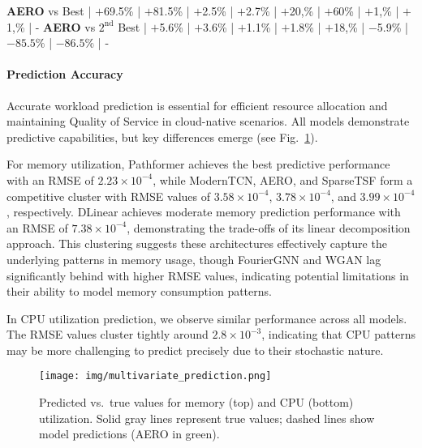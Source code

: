 \documentclass{ieeetmlcn}
\begin{document}
\begin{table}
{\begin{tabular}
    \textbf{AERO} vs Best  |  $+$69.5\%  |  $+$81.5\%  |  $+$2.5\%  |  $+$2.7\%  |  $+$20,\%  |  $+$60\%  |  $+$1,\%  |  $+$1,\%  |  - 
    \textbf{AERO} vs $2^{\text{nd}}$ Best  |  $+$5.6\%  |  $+$3.6\%  |  $+$1.1\%  |  $+$1.8\%  |  $+$18,\%  |  $-$5.9\%  |  $-85.5\%$  |  $-86.5\%$  |  - 
    
    \end{tabular}%
    }
\end{table}
    
    
\paragraph*{Prediction Accuracy}
\label{sec:predictionaccuracy}

Accurate workload prediction is essential for efficient resource allocation and maintaining Quality of Service in cloud-native scenarios. All models demonstrate predictive capabilities, but key differences emerge (see Fig.~\ref{fig:multivariate_prediction}). 

For memory utilization, Pathformer achieves the best predictive performance with an RMSE of $2.23 \times 10^{-4}$, while ModernTCN, AERO, and SparseTSF form a competitive cluster with RMSE values of $3.58 \times 10^{-4}$, $3.78 \times 10^{-4}$, and $3.99 \times 10^{-4}$, respectively. {\color{blue} DLinear achieves moderate memory prediction performance with an RMSE of $7.38 \times 10^{-4}$, demonstrating the trade-offs of its linear decomposition approach.} This clustering suggests these architectures effectively capture the underlying patterns in memory usage, though FourierGNN and WGAN lag significantly behind with higher RMSE values, indicating potential limitations in their ability to model memory consumption patterns.

In CPU utilization prediction, we observe similar performance across all models. The RMSE values cluster tightly around $2.8 \times 10^{-3}$, indicating that CPU patterns may be more challenging to predict precisely due to their stochastic nature.

\begin{figure}\centering
[t]
\centering
\centering\texttt{[image: img/multivariate\_prediction.png]}
\caption{Predicted vs.\ true values for memory (top) and CPU (bottom) utilization. Solid gray lines represent true values; dashed lines show model predictions (AERO in green).}
\label{fig:multivariate_prediction}
\end{figure}
\end{document}
